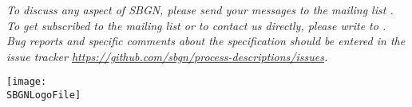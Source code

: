 \begin{titlepage}
\begin{center}

\vfill

\normalsize
\begin{minipage}{5in}
  \emph{To discuss any aspect of SBGN, please send your messages
    to the mailing list .  To get
    subscribed to the mailing list or to contact us directly,
    please write to . Bug reports and specific comments about the specification should be entered in the issue tracker \url{https://github.com/sbgn/process-descriptions/issues}.}
\end{minipage}

\vfill

\centerline{\texttt{[image: \\SBGNLogoFile]}}

\end{center}

\end{titlepage}

%
%

\setcounter{page}{2}


